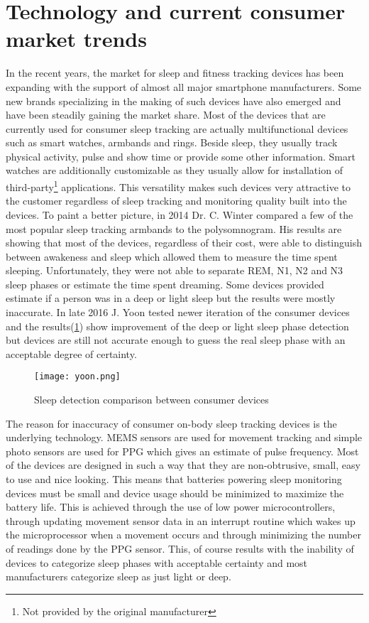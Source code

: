 \section{Technology and current consumer market trends}

In the recent years, the market for sleep and fitness tracking devices has been expanding with the support of almost all major smartphone manufacturers. Some new brands specializing in the making of such devices have also emerged and have been steadily gaining the market share. Most of the devices that are currently used for consumer sleep tracking are actually multifunctional devices such as smart watches, armbands and rings. Beside sleep, they usually track physical activity, pulse and show time or provide some other information. Smart watches are additionally customizable as they usually allow for installation of third-party\footnote{Not provided by the original manufacturer} applications. This versatility makes such devices very attractive to the customer regardless of sleep tracking and monitoring quality built into the devices. To paint a better picture, in 2014 Dr. C. Winter compared a few of the most popular sleep tracking armbands to the polysomnogram\cite{Winter}. His results are showing that most of the devices, regardless of their cost, were able to distinguish between awakeness and sleep which allowed them to measure the time spent sleeping. Unfortunately, they were not able to separate REM, N1, N2 and N3 sleep phases or estimate the time spent dreaming. Some devices provided estimate if a person was in a deep or light sleep but the results were mostly inaccurate. In late 2016 J. Yoon tested newer iteration of the consumer devices and the results(\ref{fig:yoon}) show improvement of the deep or light sleep phase detection but devices are still not accurate enough to guess the real sleep phase with an acceptable degree of certainty\cite{Yoon}.


\begin{figure}[h]
  \begin{center}
    \texttt{[image: yoon.png]}
  \end{center}
  \caption{Sleep detection comparison between consumer devices}
  \label{fig:yoon}
\end{figure}

The reason for inaccuracy of consumer on-body sleep tracking devices is the underlying technology. \ac{MEMS} sensors are used for movement tracking and simple photo sensors are used for \ac{PPG} which gives an estimate of pulse frequency. Most of the devices are designed in such a way that they are non-obtrusive, small, easy to use and nice looking. This means that batteries powering sleep monitoring devices must be small and device usage should be minimized to maximize the battery life. This is achieved through the use of low power microcontrollers, through updating movement sensor data in an interrupt routine which wakes up the microprocessor when a movement occurs and through minimizing the number of readings done by the \ac{PPG} sensor. This, of course results with the inability of devices to categorize sleep phases with acceptable certainty and most manufacturers categorize sleep as just light or deep.

